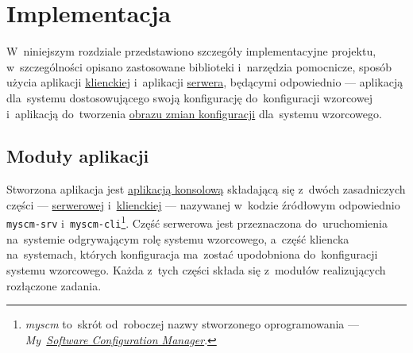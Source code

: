 \documentclass[thesis]{subfiles}
\begin{document}
\newcommand{\srvappname}{myscm-srv}
\newcommand{\cliappname}{myscm-cli}
\newcommand{\myscmsrvconfig}{\path{/etc/myscm-srv/config.ini}}
\newcommand{\myscmcliconfig}{\path{/etc/myscm-cli/config.ini}}
\newcommand{\sftp}{\href{https://en.wikipedia.org/wiki/SSH_File_Transfer_Protocol}{SFTP}}
\newcommand{\myscmsrvlogconfig}{\path{/etc/myscm-srv/log_config.yaml}}
\newcommand{\aideconfig}{\path{/etc/myscm-srv/aide.conf}}

\chapter{Implementacja}
\label{ch:implementacja}

W~niniejszym rozdziale przedstawiono szczegóły implementacyjne projektu, w~szczególności opisano zastosowane biblioteki i~narzędzia pomocnicze, sposób użycia aplikacji \hyperref[sec:cli-app]{klienckiej} i~aplikacji \hyperref[sec:srv-app]{serwera}, będącymi odpowiednio --- aplikacją dla~systemu dostosowującego swoją konfigurację do~konfiguracji wzorcowej i~aplikacją do~tworzenia \hyperref[sec:obraz-zmian-konfiguracji]{obrazu zmian konfiguracji} dla~systemu wzorcowego.


\section{Moduły aplikacji}

Stworzona aplikacja jest \href{https://en.wikipedia.org/wiki/Command-line_interface}{aplikacją konsolową} składającą się z~dwóch zasadniczych części --- \hyperref[sec:srv-app]{serwerowej} i~\hyperref[sec:cli-app]{klienckiej} --- nazywanej w~kodzie źródłowym odpowiednio \texttt{myscm-srv} i~\texttt{myscm-cli}\footnote{\emph{myscm} to~skrót od~roboczej nazwy stworzonego oprogramowania --- \emph{My~\href{https://en.wikipedia.org/wiki/Software_configuration_management}{Software Configuration Manager}}.}. Część serwerowa jest przeznaczona do~uruchomienia na~systemie odgrywającym rolę systemu wzorcowego, a~część kliencka na~systemach, których konfiguracja ma~zostać upodobniona do~konfiguracji systemu wzorcowego. Każda z~tych części składa się z~modułów realizujących rozłączone zadania.
\end{document}
